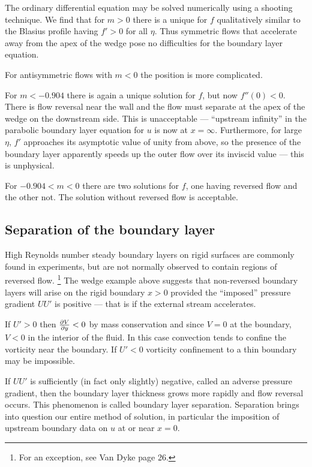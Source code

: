 \documentclass{notes}
\theoremstyle{plain}
\begin{document}
The ordinary differential equation may be solved numerically using a
shooting technique.  We find that for $m > 0$ there is a unique for
$f$ qualitatively similar to the Blasius profile having $f' > 0$ for
all $\eta$.  Thus symmetric flows that accelerate away from the apex of
the wedge pose no difficulties for the boundary layer equation.

For antisymmetric flows with $m < 0$ the position is more complicated.

\vspace{1in}

For $m < -0.904$ there is again a unique solution for $f$, but
now $f''(0) < 0$.  There is flow reversal near the wall and the flow
must separate at the apex of the wedge on the downstream side.  This
is unacceptable --- ``upstream infinity'' in the parabolic boundary
layer equation for $u$ is now at $x = \infty$.  Furthermore, for large
$\eta$, $f'$ approaches its asymptotic value of unity from above, so the
presence of the boundary layer apparently speeds up the outer flow
over its inviscid value --- this is unphysical.

For $-0.904 < m < 0$ there are two solutions for $f$, one having
reversed flow and the other not.  The solution without reversed flow
is acceptable.

\subsection{Separation of the boundary layer}

High Reynolds number steady boundary layers on rigid surfaces are commonly
found in experiments, but are not normally observed to contain regions
of reversed flow.%
\footnote{For an exception, see Van Dyke page 26.}
The wedge example above suggests that non-reversed boundary layers
will arise on the rigid boundary $x > 0$ provided the ``imposed'' pressure
gradient $U U'$ is positive --- that is if the external stream accelerates.

If $U' > 0$ then $\frac{\partial V}{\partial y} < 0$ by mass conservation and since $V = 0$
at the boundary, $V < 0$ in the interior of the fluid.  In this case
convection tends to confine the vorticity near the boundary.  If $U' < 0$
vorticity confinement to a thin boundary may be impossible.

If $U U'$ is sufficiently (in fact only slightly) negative, called
an adverse pressure gradient, then the boundary layer thickness grows
more rapidly and flow reversal occurs.  This phenomenon is called
boundary layer separation.  Separation brings into question our entire
method of solution, in particular the imposition of upstream boundary data
on $u$ at or near $x=0$.
\end{document}
